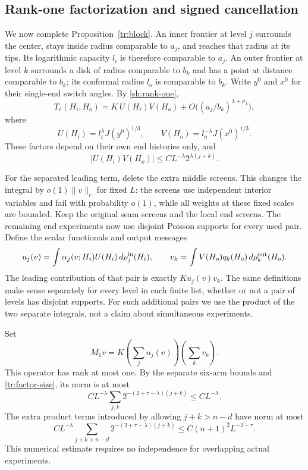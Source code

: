 \subsection{Rank-one factorization and signed cancellation}

We now complete Proposition~\ref{tr:block}.  An inner frontier at
level $j$ surrounds the center, stays inside radius comparable to
$a_j$, and reaches that radius at its tips.  Its logarithmic capacity
$l_i$ is therefore comparable to $a_j$.  An outer frontier at level
$k$ surrounds a disk of radius comparable to $b_k$ and has a point
at distance comparable to $b_k$; its conformal radius $l_o$ is
comparable to $b_k$.  Write $y^0$ and $x^0$ for their single-end
switch angles.  By \eqref{sh:rank-one},
\begin{equation}
 T_r(H_i,H_o)=K\,U(H_i)V(H_o)
                       +O\big((a_j/b_k)^{\lambda+\sigma_1}\big),
\label{tr:separated-formula}
\end{equation}
where
\[
 U(H_i)=l_i^\lambda J(y^0)^{1/3},
 \qquad
 V(H_o)=l_o^{-\lambda}J(x^0)^{1/3}.
\]
These factors depend on their own end histories only, and
\begin{equation}
             |U(H_i)V(H_o)|
                  \le C L^{-\lambda}2^{\lambda(j+k)}.
\label{tr:factor-size}
\end{equation}

For the separated leading term, delete the extra middle screens.
This changes the integral by $o(1)\|v\|_r$ for fixed $L$: the screens
use independent interior variables and fail with probability $o(1)$,
while all weights at these fixed scales are bounded.  Keep the original
seam screens and the local end screens.  The remaining end experiments
now use disjoint Poisson supports for every used pair.  Define the
scalar functionals and output messages
\[
 u_j(v)=\int \alpha_j(v;H_i)U(H_i)\,d\rho_j^{\rm in}(H_i),
 \qquad
 v_k=\int V(H_o)q_k(H_o)\,d\rho_k^{\rm out}(H_o).
\]
The leading contribution of that pair is exactly $K u_j(v)v_k$.
The same definitions make sense separately for every level in each
finite list, whether or not a pair of levels has disjoint supports.
For such additional pairs we use the product of the two separate
integrals, not a claim about simultaneous experiments.

Set
\begin{equation}
       M_1v=K\left(\sum_j u_j(v)\right)\left(\sum_k v_k\right).
\label{tr:rank-one-definition}
\end{equation}
This operator has rank at most one.  By the separate six-arm bounds
and \eqref{tr:factor-size}, its norm is at most
\begin{equation}
 C L^{-\lambda}
       \sum_{j,k}2^{-(2+\tau-\lambda)(j+k)}
                   \le C L^{-\lambda}.
\label{tr:rank-one-size}
\end{equation}
The extra product terms introduced by allowing $j+k>n-d$ have norm
at most
\begin{equation}
 C L^{-\lambda}
      \sum_{j+k>n-d}2^{-(2+\tau-\lambda)(j+k)}
                   \le C(n+1)^2L^{-2-\tau}.
\label{tr:artificial-pairs}
\end{equation}
This numerical estimate requires no independence for overlapping
actual experiments.

